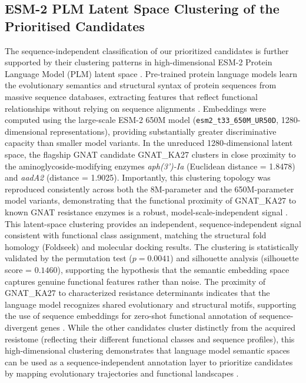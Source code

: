 \documentclass[pdflatex,sn-mathphys-num]{sn-jnl}
\begin{document}
\subsection{ESM-2 PLM Latent Space Clustering of the Prioritised Candidates}
The sequence-independent classification of our prioritized candidates is further supported by their clustering patterns in high-dimensional ESM-2 Protein Language Model (PLM) latent space \cite{lin2023evolutionary}. Pre-trained protein language models learn the evolutionary semantics and structural syntax of protein sequences from massive sequence databases, extracting features that reflect functional relationships without relying on sequence alignments \cite{rives2021biological,heinzinger2021elucidating,bepler2019learning}. Embeddings were computed using the large-scale ESM-2 650M model (\texttt{esm2\_t33\_650M\_UR50D}, 1280-dimensional representations), providing substantially greater discriminative capacity than smaller model variants. In the unreduced 1280-dimensional latent space, the flagship GNAT candidate GNAT\_KA27 clusters in close proximity to the aminoglycoside-modifying enzymes \textit{aph(3')-Ia} (Euclidean distance = 1.8478) and \textit{aadA2} (distance = 1.9025). Importantly, this clustering topology was reproduced consistently across both the 8M-parameter and the 650M-parameter model variants, demonstrating that the functional proximity of GNAT\_KA27 to known GNAT resistance enzymes is a robust, model-scale-independent signal \cite{zheng2026plm}. This latent-space clustering provides an independent, sequence-independent signal consistent with functional class assignment, matching the structural fold homology (Foldseek) and molecular docking results. The clustering is statistically validated by the permutation test ($p = 0.0041$) and silhouette analysis (silhouette score = $0.1460$), supporting the hypothesis that the semantic embedding space captures genuine functional features rather than noise. The proximity of GNAT\_KA27 to characterized resistance determinants indicates that the language model recognizes shared evolutionary and structural motifs, supporting the use of sequence embeddings for zero-shot functional annotation of sequence-divergent genes \cite{zheng2026plm}. While the other candidates cluster distinctly from the acquired resistome (reflecting their different functional classes and sequence profiles), this high-dimensional clustering demonstrates that language model semantic spaces can be used as a sequence-independent annotation layer to prioritize candidates by mapping evolutionary trajectories and functional landscapes \cite{hie2022evolutionary,madani2023large}.
\end{document}
